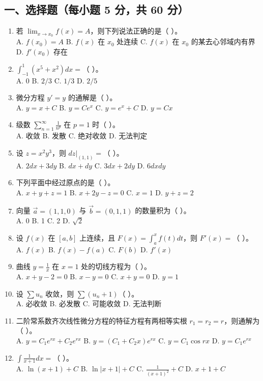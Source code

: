 \documentclass[11pt,a4paper]{article}
\begin{document}
\subsection*{一、选择题（每小题 5 分，共 60 分）}
\begin{enumerate}
    \item 若 $\lim_{x \to x_0} f(x) = A$，则下列说法正确的是（ ）。 \\
    A. $f(x_0) = A$ \quad B. $f(x)$ 在 $x_0$ 处连续 \quad C. $f(x)$ 在 $x_0$ 的某去心邻域内有界 \quad D. $f'(x_0)$ 存在
    \item $\int_{-1}^1 (x^5 + x^2) dx = $（ ）。 \\
    A. 0 \quad B. $2/3$ \quad C. $1/3$ \quad D. $2/5$
    \item 微分方程 $y' = y$ 的通解是（ ）。 \\
    A. $y = x+C$ \quad B. $y = Ce^x$ \quad C. $y = e^x + C$ \quad D. $y = Cx$
    \item 级数 $\sum_{n=1}^{\infty} \frac{1}{n^p}$ 在 $p=1$ 时（ ）。 \\
    A. 收敛 \quad B. 发散 \quad C. 绝对收敛 \quad D. 无法判定
    \item 设 $z = x^2 y^3$，则 $dz|_{(1,1)} = $（ ）。 \\
    A. $2dx + 3dy$ \quad B. $dx + dy$ \quad C. $3dx + 2dy$ \quad D. $6dx dy$
    \item 下列平面中经过原点的是（ ）。 \\
    A. $x+y+z=1$ \quad B. $x+2y-z=0$ \quad C. $x=1$ \quad D. $y+z=2$
    \item 向量 $\vec{a}=(1,1,0)$ 与 $\vec{b}=(0,1,1)$ 的数量积为（ ）。 \\
    A. 0 \quad B. 1 \quad C. 2 \quad D. $\sqrt{2}$
    \item 设 $f(x)$ 在 $[a,b]$ 上连续，且 $F(x) = \int_a^x f(t) dt$，则 $F'(x) = $（ ）。 \\
    A. $f(x)$ \quad B. $f(x)-f(a)$ \quad C. $F(b)$ \quad D. $f'(x)$
    \item 曲线 $y = \frac{1}{x}$ 在 $x=1$ 处的切线方程为（ ）。 \\
    A. $x+y-2=0$ \quad B. $x-y=0$ \quad C. $x+y=0$ \quad D. $y=1$
    \item 设 $\sum u_n$ 收敛，则 $\sum (u_n + 1)$（ ）。 \\
    A. 必收敛 \quad B. 必发散 \quad C. 可能收敛 \quad D. 无法判断
    \item 二阶常系数齐次线性微分方程的特征方程有两相等实根 $r_1=r_2=r$，则通解为（ ）。 \\
    A. $y = C_1 e^{rx} + C_2 e^{rx}$ \quad B. $y = (C_1+C_2 x)e^{rx}$ \quad C. $y = C_1 \cos rx$ \quad D. $y = C_1 e^{rx}$
    \item $\int \frac{1}{x+1} dx = $（ ）。 \\
    A. $\ln(x+1) + C$ \quad B. $\ln|x+1| + C$ \quad C. $\frac{1}{(x+1)^2} + C$ \quad D. $x+1 + C$
\end{enumerate}
\end{document}
